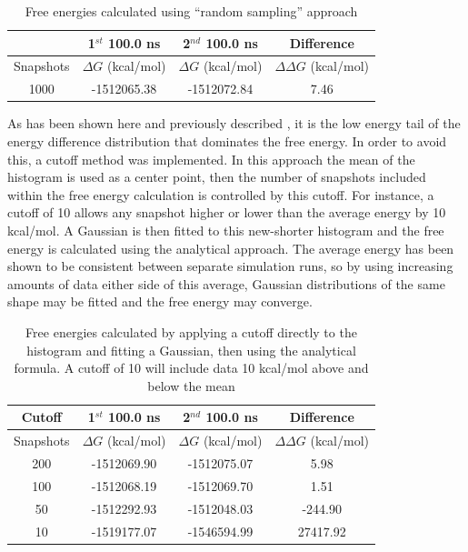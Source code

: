 \begin{table}[ht]
 \caption{Free energies calculated using ``random sampling'' approach}
  \begin{center}
  \begin{tabular}{c|c|c|c}
   \hline\hline
 & 1$^{st}$ 100.0 ns & 2$^{nd}$ 100.0 ns & Difference \\
 \hline
Snapshots & $\Delta G$ (kcal/mol) & $\Delta G$ (kcal/mol) & $\Delta\Delta G$ (kcal/mol) \\
 \hline
1000 & -1512065.38 & -1512072.84 & 7.46 \\
 \end{tabular}\label{table:average_exponents_free_energy}
 \end{center}
\end{table}

As has been shown here and previously described \cite{good_practice_free_energy}, it is the low energy tail of the energy difference distribution that dominates the free energy.  In order to avoid this, a cutoff method was implemented.  In this approach the mean of the histogram is used as a center point, then the number of snapshots included within the free energy calculation is controlled by this cutoff.  For instance, a cutoff of 10 allows any snapshot higher or lower than the average energy by 10 kcal/mol.  A Gaussian is then fitted to this new-shorter histogram and the free energy is calculated using the analytical approach.  The average energy has been shown to be consistent between separate simulation runs, so by using increasing amounts of data either side of this average, Gaussian distributions of the same shape may be fitted and the free energy may converge.

\begin{table}[ht]
 \caption{Free energies calculated by applying a cutoff directly to the histogram and fitting a Gaussian, then using the analytical formula.  A cutoff of 10 will include data 10 kcal/mol above and below the mean}
  \begin{center}
  \begin{tabular}{c|c|c|c}
   \hline\hline
Cutoff & 1$^{st}$ 100.0 ns & 2$^{nd}$ 100.0 ns & Difference \\
 \hline
Snapshots & $\Delta G$ (kcal/mol) & $\Delta G$ (kcal/mol) & $\Delta\Delta G$ (kcal/mol) \\
 \hline
 200 & -1512069.90 & -1512075.07 & 5.98 \\
  \hline
 100 & -1512068.19 & -1512069.70 & 1.51 \\
  \hline
 50 & -1512292.93 & -1512048.03 & -244.90 \\
  \hline
 10 & -1519177.07 & -1546594.99 & 27417.92 \\
 \end{tabular}\label{table:histogram_cutoff_free_energy}
 \end{center}
\end{table}


